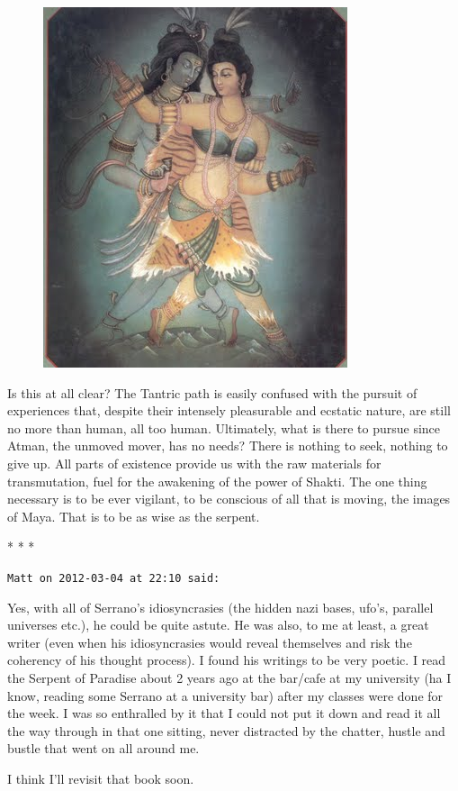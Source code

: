 \begin{figure}
 \includegraphics[scale=.3]{a20120304TheEternalWedding-img001.jpg}
\end{figure}
Is this at all clear? The Tantric path is easily confused with the pursuit of experiences that, despite their intensely pleasurable and ecstatic nature, are still no more than human, all too human. Ultimately, what is there to pursue since Atman, the unmoved mover, has no needs? There is nothing to seek, nothing to give up. All parts of existence provide us with the raw materials for transmutation, fuel for the awakening of the power of Shakti. The one thing necessary is to be ever vigilant, to be conscious of all that is moving, the images of Maya. That is to be as wise as the serpent.




\begin{center}* * *\end{center}

\begin{footnotesize}\begin{sffamily}



\texttt{Matt on 2012-03-04 at 22:10 said: }

Yes, with all of Serrano's idiosyncrasies (the hidden nazi bases, ufo's, parallel universes etc.), he could be quite astute. He was also, to me at least, a great writer (even when his idiosyncrasies would reveal themselves and risk the coherency of his thought process). I found his writings to be very poetic. I read the Serpent of Paradise about 2 years ago at the bar/cafe at my university (ha I know, reading some Serrano at a university bar) after my classes were done for the week. I was so enthralled by it that I could not put it down and read it all the way through in that one sitting, never distracted by the chatter, hustle and bustle that went on all around me.

I think I'll revisit that book soon.


\end{sffamily}\end{footnotesize}
